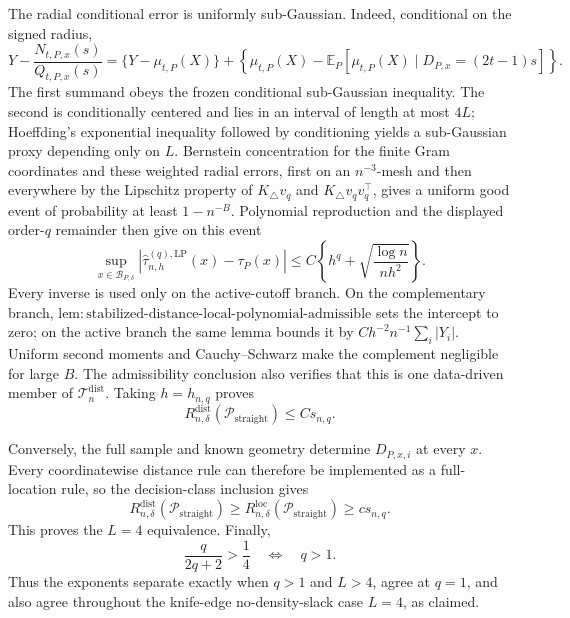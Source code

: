 The radial conditional error is uniformly sub-Gaussian.  Indeed, conditional on the signed radius,
\[
 Y-\frac{N_{t,P,x}(s)}{Q_{t,P,x}(s)}
 =\{Y-\mu_{t,P}(X)\}
 +\left\{\mu_{t,P}(X)-
 \mathbb E_P[\mu_{t,P}(X)\mid D_{P,x}=(2t-1)s]\right\}.
\]
The first summand obeys the frozen conditional sub-Gaussian inequality.  The second is conditionally centered and lies in an interval of length at most \(4L\); Hoeffding's exponential inequality followed by conditioning yields a sub-Gaussian proxy depending only on \(L\).  Bernstein concentration for the finite Gram coordinates and these weighted radial errors, first on an \(n^{-3}\)-mesh and then everywhere by the Lipschitz property of \(K_\triangle v_q\) and \(K_\triangle v_qv_q^\top\), gives a uniform good event of probability at least \(1-n^{-B}\).  Polynomial reproduction and the displayed order-\(q\) remainder then give on this event
\[
 \sup_{x\in\mathcal B_{P,\delta}}
 |\widehat\tau^{(q),\mathrm{LP}}_{n,h}(x)-\tau_P(x)|
 \leq C\left\{h^q+\sqrt{\frac{\log n}{nh^2}}\right\}.
\]
Every inverse is used only on the active-cutoff branch.  On the complementary branch, \(\mathrm{lem:stabilized\text{-}distance\text{-}local\text{-}polynomial\text{-}admissible}\) sets the intercept to zero; on the active branch the same lemma bounds it by \(Ch^{-2}n^{-1}\sum_i|Y_i|\).  Uniform second moments and Cauchy--Schwarz make the complement negligible for large \(B\).  The admissibility conclusion also verifies that this is one data-driven member of \(\mathcal T_n^{\mathrm{dist}}\).  Taking \(h=h_{n,q}\) proves
\[
 R_{n,\delta}^{\mathrm{dist}}(\mathcal P_{\mathrm{straight}})
 \leq Cs_{n,q}.
\]

Conversely, the full sample and known geometry determine \(D_{P,x,i}\) at every \(x\).  Every coordinatewise distance rule can therefore be implemented as a full-location rule, so the decision-class inclusion gives
\[
 R_{n,\delta}^{\mathrm{dist}}(\mathcal P_{\mathrm{straight}})
 \geq R_{n,\delta}^{\mathrm{loc}}(\mathcal P_{\mathrm{straight}})
 \geq cs_{n,q}.
\]
This proves the \(L=4\) equivalence.  Finally,
\[
 \frac{q}{2q+2}>\frac14\quad\Longleftrightarrow\quad q>1.
\]
Thus the exponents separate exactly when \(q>1\) and \(L>4\), agree at \(q=1\), and also agree throughout the knife-edge no-density-slack case \(L=4\), as claimed.